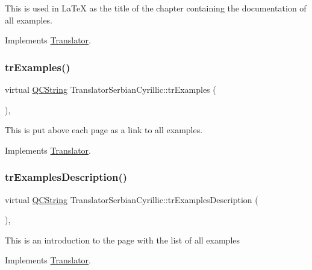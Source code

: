 This is used in La\+TeX as the title of the chapter containing the documentation of all examples. 

Implements \mbox{\hyperlink{class_translator}{Translator}}.

\mbox{\label{class_translator_serbian_cyrillic_abd4dc589411ccaeb55462764edeb5367}} 
\subsubsection{\texorpdfstring{trExamples()}{trExamples()}}
{\footnotesize\ttfamily virtual \mbox{\hyperlink{class_q_c_string}{Q\+C\+String}} Translator\+Serbian\+Cyrillic\+::tr\+Examples (\begin{DoxyParamCaption}{ }\end{DoxyParamCaption})\hspace{0.3cm}{\ttfamily [inline]}, {\ttfamily [virtual]}}

This is put above each page as a link to all examples. 

Implements \mbox{\hyperlink{class_translator}{Translator}}.

\mbox{\label{class_translator_serbian_cyrillic_a1e5a0dad07a8b79a296541236bf0708e}} 
\subsubsection{\texorpdfstring{trExamplesDescription()}{trExamplesDescription()}}
{\footnotesize\ttfamily virtual \mbox{\hyperlink{class_q_c_string}{Q\+C\+String}} Translator\+Serbian\+Cyrillic\+::tr\+Examples\+Description (\begin{DoxyParamCaption}{ }\end{DoxyParamCaption})\hspace{0.3cm}{\ttfamily [inline]}, {\ttfamily [virtual]}}

This is an introduction to the page with the list of all examples 

Implements \mbox{\hyperlink{class_translator}{Translator}}.

